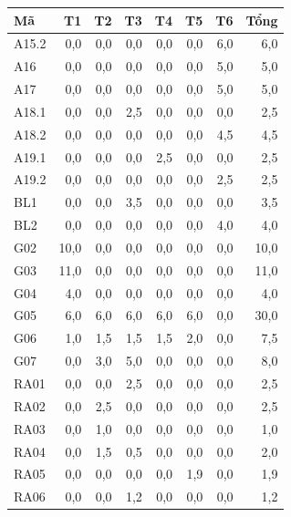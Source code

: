 \begin{table}[H]
\begin{minipage}[t]{.46\linewidth}
\begin{tabular*}{\linewidth}{@{\extracolsep{\fill}}lrrrrrrr@{}}
\bottomrule
\end{tabular*}
\end{minipage}\hfill
\begin{minipage}[t]{.46\linewidth}
\vspace{0pt}\centering
\begin{tabular*}{\linewidth}{@{\extracolsep{\fill}}lrrrrrrr@{}}
\toprule
\textbf{Mã} & \textbf{T1} & \textbf{T2} & \textbf{T3} & \textbf{T4} & \textbf{T5} & \textbf{T6} & \textbf{Tổng} \\
\midrule
A15.2 & 0,0 & 0,0 & 0,0 & 0,0 & 0,0 & 6,0 & 6,0 \\
A16 & 0,0 & 0,0 & 0,0 & 0,0 & 0,0 & 5,0 & 5,0 \\
A17 & 0,0 & 0,0 & 0,0 & 0,0 & 0,0 & 5,0 & 5,0 \\
A18.1 & 0,0 & 0,0 & 2,5 & 0,0 & 0,0 & 0,0 & 2,5 \\
A18.2 & 0,0 & 0,0 & 0,0 & 0,0 & 0,0 & 4,5 & 4,5 \\
A19.1 & 0,0 & 0,0 & 0,0 & 2,5 & 0,0 & 0,0 & 2,5 \\
A19.2 & 0,0 & 0,0 & 0,0 & 0,0 & 0,0 & 2,5 & 2,5 \\
BL1 & 0,0 & 0,0 & 3,5 & 0,0 & 0,0 & 0,0 & 3,5 \\
BL2 & 0,0 & 0,0 & 0,0 & 0,0 & 0,0 & 4,0 & 4,0 \\
G02 & 10,0 & 0,0 & 0,0 & 0,0 & 0,0 & 0,0 & 10,0 \\
G03 & 11,0 & 0,0 & 0,0 & 0,0 & 0,0 & 0,0 & 11,0 \\
G04 & 4,0 & 0,0 & 0,0 & 0,0 & 0,0 & 0,0 & 4,0 \\
G05 & 6,0 & 6,0 & 6,0 & 6,0 & 6,0 & 0,0 & 30,0 \\
G06 & 1,0 & 1,5 & 1,5 & 1,5 & 2,0 & 0,0 & 7,5 \\
G07 & 0,0 & 3,0 & 5,0 & 0,0 & 0,0 & 0,0 & 8,0 \\
RA01 & 0,0 & 0,0 & 2,5 & 0,0 & 0,0 & 0,0 & 2,5 \\
RA02 & 0,0 & 2,5 & 0,0 & 0,0 & 0,0 & 0,0 & 2,5 \\
RA03 & 0,0 & 1,0 & 0,0 & 0,0 & 0,0 & 0,0 & 1,0 \\
RA04 & 0,0 & 1,5 & 0,5 & 0,0 & 0,0 & 0,0 & 2,0 \\
RA05 & 0,0 & 0,0 & 0,0 & 0,0 & 1,9 & 0,0 & 1,9 \\
RA06 & 0,0 & 0,0 & 1,2 & 0,0 & 0,0 & 0,0 & 1,2 \\
\bottomrule
\end{tabular*}
\end{minipage}
\endgroup
\end{table}

